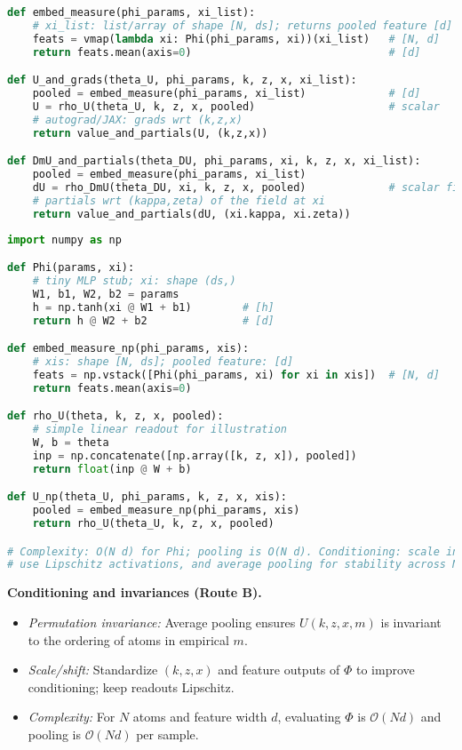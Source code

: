 ﻿\documentclass[11pt,letterpaper,oneside]{article}
\numberwithin{equation}{section}
\newcommand{\1}{\mathbf{1}}
\begin{document}
\begin{lstlisting}[language=Python,caption={DeepSets-style pooling for U and D\_m U (pseudo-JAX)}]
def embed_measure(phi_params, xi_list):
    # xi_list: list/array of shape [N, ds]; returns pooled feature [d]
    feats = vmap(lambda xi: Phi(phi_params, xi))(xi_list)   # [N, d]
    return feats.mean(axis=0)                               # [d]

def U_and_grads(theta_U, phi_params, k, z, x, xi_list):
    pooled = embed_measure(phi_params, xi_list)             # [d]
    U = rho_U(theta_U, k, z, x, pooled)                     # scalar
    # autograd/JAX: grads wrt (k,z,x)
    return value_and_partials(U, (k,z,x))

def DmU_and_partials(theta_DU, phi_params, xi, k, z, x, xi_list):
    pooled = embed_measure(phi_params, xi_list)
    dU = rho_DmU(theta_DU, xi, k, z, x, pooled)             # scalar field at xi
    # partials wrt (kappa,zeta) of the field at xi
    return value_and_partials(dU, (xi.kappa, xi.zeta))
\end{lstlisting}

\begin{lstlisting}[language=Python,caption={Minimal NumPy sketch (DeepSets pooling and readout)}]
import numpy as np

def Phi(params, xi):
    # tiny MLP stub; xi: shape (ds,)
    W1, b1, W2, b2 = params
    h = np.tanh(xi @ W1 + b1)        # [h]
    return h @ W2 + b2               # [d]

def embed_measure_np(phi_params, xis):
    # xis: shape [N, ds]; pooled feature: [d]
    feats = np.vstack([Phi(phi_params, xi) for xi in xis])  # [N, d]
    return feats.mean(axis=0)

def rho_U(theta, k, z, x, pooled):
    # simple linear readout for illustration
    W, b = theta
    inp = np.concatenate([np.array([k, z, x]), pooled])
    return float(inp @ W + b)

def U_np(theta_U, phi_params, k, z, x, xis):
    pooled = embed_measure_np(phi_params, xis)
    return rho_U(theta_U, k, z, x, pooled)

# Complexity: O(N d) for Phi; pooling is O(N d). Conditioning: scale inputs,
# use Lipschitz activations, and average pooling for stability across N.
\end{lstlisting}

\begin{tcolorbox}[mathstyle]
\textbf{Conditioning and invariances (Route B).}
\begin{itemize}[leftmargin=1.15em,itemsep=0.25em]
  \item \emph{Permutation invariance:} Average pooling ensures $U(k,z,x,m)$ is invariant to the ordering of atoms in empirical $m$.
  \item \emph{Scale/shift:} Standardize $(k,z,x)$ and feature outputs of $\Phi$ to improve conditioning; keep readouts Lipschitz.
  \item \emph{Complexity:} For $N$ atoms and feature width $d$, evaluating $\Phi$ is $\mathcal O(N d)$ and pooling is $\mathcal O(N d)$ per sample.
\end{itemize}
\end{tcolorbox}
\end{document}
